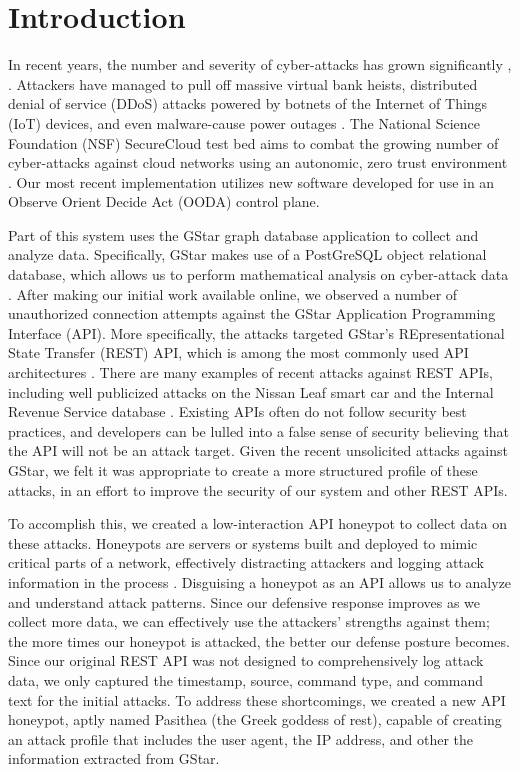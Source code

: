 
\section{Introduction} \label{intro}

In recent years, the number and severity of cyber-attacks has grown significantly \cite{Symantec-Threat-Report}, \cite{IBM-XForce-Report}. Attackers have managed to pull off massive virtual bank heists, distributed denial of service (DDoS) attacks powered by botnets of the Internet of Things (IoT) devices, and even malware-cause power outages \cite{IBM-XForce-Report}. The National Science Foundation (NSF) SecureCloud test bed aims to combat the growing number of cyber-attacks against cloud networks using an autonomic, zero trust environment \cite{7796146}.  Our most recent implementation utilizes new software developed for use in an Observe Orient Decide Act (OODA) control plane.

Part of this system uses the GStar graph database application to collect and analyze data. Specifically, GStar makes use of a PostGreSQL object relational database, which allows us to perform mathematical analysis on cyber-attack data \cite{GStar}.  After making our initial work available online, we observed a number of unauthorized connection attempts against the GStar Application Programming Interface (API).  More specifically, the attacks targeted GStar's REpresentational State Transfer (REST) API, which is among the most commonly used API architectures \cite{REST-API-use}. There are many examples of recent attacks against REST APIs, including well publicized attacks on the Nissan Leaf smart car \cite{Nissan-Leaf} and the Internal Revenue Service database \cite{IRS}.  Existing APIs often do not follow security best practices, and developers can be lulled into a false sense of security believing that the API will not be an attack target.  Given the recent unsolicited attacks against GStar, we felt it was appropriate to create a more structured profile of these attacks, in an effort to improve the security of our system and other REST APIs.

To accomplish this, we created a low-interaction API honeypot to collect data on these attacks.  Honeypots are servers or systems built and deployed to mimic critical parts of a network, effectively distracting attackers and logging attack information in the process \cite{honeypot-Def}. Disguising a honeypot as an API allows us to analyze and understand attack patterns.  Since our defensive response improves as we collect more data, we can effectively use the attackers' strengths against them; the more times our honeypot is attacked, the better our defense posture becomes.  Since our original REST API was not designed to comprehensively log attack data, we only captured the timestamp, source, command type, and command text for the initial attacks.  To address these shortcomings, we created a new API honeypot, aptly named Pasithea (the Greek goddess of rest), capable of creating an attack profile that includes the user agent, the IP address, and other the information extracted from GStar.


